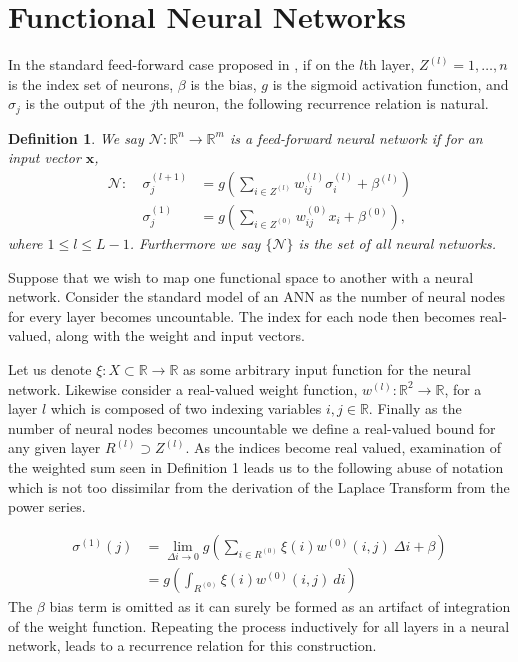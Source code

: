 \documentclass{article}
\newtheorem{definition}[theorem]{Definition}
\begin{document}
\section{Functional Neural Networks}
  In the standard feed-forward case proposed in \cite{mcculloch}, if on the $l$th layer, $Z^{(l)} = {1,\dots,n}$ is the index set of neurons, $\beta$ is the bias, $g$ is the sigmoid activation function, and $\sigma_j$ is the output of the $j$th neuron, the following recurrence relation is natural.
    \begin{definition}
    
    We say $\mathcal{N}: \mathbb{R}^n \to \mathbb{R}^m$ is a feed-forward neural network if for an input vector $\pmb{x}$,
    \begin{equation}
            \begin{aligned}
        \mathcal{N}:\ & \sigma_j^{(l+1)} &= g\left(\sum_{i \in Z^{(l)}}w_{ij}^{(l)}\sigma_i^{(l)} + \beta^{(l)}\right) \\ & \sigma_j^{(1)} &= g\left(\sum_{i \in Z^{(0)}}w_{ij}^{(0)}x_i + \beta^{(0)} \right),
        \end{aligned}
    \end{equation}
    where $1\leq l \leq L-1$. Furthermore we say $\{\mathcal{N}\}$ is the set of all neural networks.
    \end{definition}
Suppose that we wish to map one functional space to another with a neural network. Consider the standard model of an ANN as the number of neural nodes for every layer becomes uncountable. The index for each node then becomes real-valued, along with the weight and input vectors.

 Let us denote \(\xi: X \subset \mathbb{R}\to\mathbb{R}\) as some arbitrary input function for the neural network. Likewise consider a real-valued weight function, \(w^{(l)}: \mathbb{R}^{2}\to\mathbb{R}\), for a layer $l$ which is composed of two indexing variables $i,j \in \mathbb{R}$. Finally as the number of neural nodes becomes uncountable we define a real-valued bound for any given layer $R^{(l)} \supset Z^{(l)}$.  As the indices become real valued, examination of the weighted sum seen in Definition 1 leads us to the following abuse of notation which is not too dissimilar from the derivation of the Laplace Transform from the power series.

 \begin{equation}
\begin{aligned}
    \sigma^{(1)}(j) &= \lim_{\Delta i \to 0}g\left(\sum_{i\in R^{(0)}} \xi(i) w^{(0)}(i,j)\ \Delta i + \beta\right) \\
    &= g\left(\int_{R^{(0)}} \xi(i) w^{(0)}(i,j)\ di\right)
\end{aligned}
\end{equation}
The $\beta$ bias term is omitted as it can surely be formed as an artifact of integration of the weight function.
Repeating the process inductively for all layers in a neural network, leads to a recurrence relation for this construction. 
\end{document}
